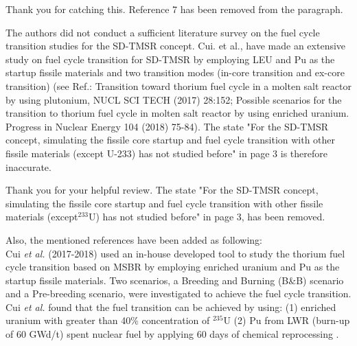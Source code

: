 \documentclass[answers,11pt]{exam}
\begin{document}
\begin{questions}
\begin{solution}
                 Thank you for catching this. Reference 7 has been removed from the paragraph.
                 
        \end{solution}


        \question The authors did not conduct a sufficient literature survey on the fuel cycle transition studies for the SD-TMSR concept. Cui. et al., have made an extensive study on fuel cycle transition for SD-TMSR by employing LEU and Pu as the startup fissile materials and two transition modes (in-core transition and ex-core transition) (see Ref.: Transition toward thorium fuel cycle in a molten salt reactor by using plutonium, NUCL SCI TECH (2017) 28:152; Possible scenarios for the transition to thorium fuel cycle in molten salt reactor by using enriched uranium. Progress in Nuclear Energy 104 (2018) 75-84). The state "For the SD-TMSR concept, simulating the fissile core startup and fuel cycle transition with other fissile materials (except U-233) has not studied before" in page 3 is therefore inaccurate.
        \begin{solution}
                Thank you for your helpful review. The state "For the SD-TMSR concept, simulating the fissile core startup and fuel cycle transition with other fissile materials (except$^{233}$U) has not studied before" in page 3, has been removed. 
                
                Also, the mentioned references have been added as following:\\
                Cui \emph{et al.} (2017-2018) used an in-house developed tool to study the thorium fuel cycle transition based on MSBR by employing enriched uranium and Pu as the startup fissile materials. Two scenarios, a Breeding and Burning (B\&B) scenario and a Pre-breeding scenario, were investigated to achieve the fuel cycle transition. Cui \emph{et al.} found that the fuel transition can be achieved by using: (1) enriched uranium with greater than 40\% concentration of $^{235}$U (2) Pu from LWR (burn-up of 60 GWd/t) spent nuclear fuel by applying 60 days of chemical reprocessing \cite{cui2017transition,cui2018possible}.
                

\end{solution}
\end{questions}
\end{document}
